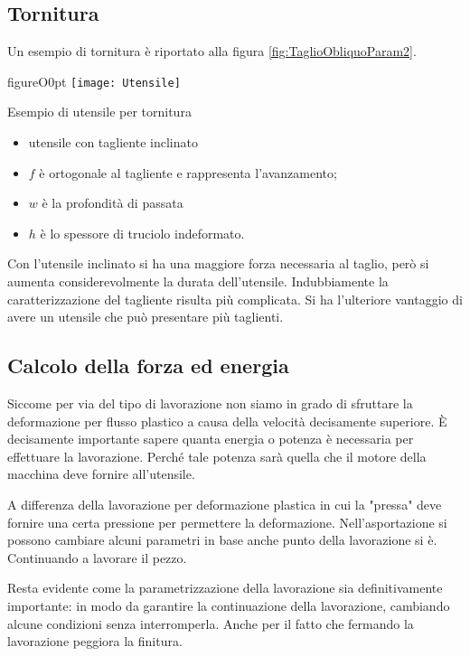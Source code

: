 \subsection{Tornitura}
Un esempio di tornitura è riportato alla figura \ref{fig:TaglioObliquoParam2}.
\begin{wrapfloat}{figure}{O}{0pt}
\texttt{[image: Utensile]}
\caption{Esempio di utensile per tornitura}
\label{fig:UtensileTornitua}
\end{wrapfloat}

\begin{itemize}
\item utensile con tagliente inclinato
\item $f$ è ortogonale al tagliente e rappresenta 
l'avanzamento;
\item $w$ è la profondità di passata
\item $h$ è lo spessore di truciolo indeformato.
\end{itemize}

Con l'utensile inclinato si ha una maggiore forza 
necessaria al taglio, però si aumenta 
considerevolmente la durata dell'utensile.
Indubbiamente la caratterizzazione del tagliente 
risulta più complicata. Si ha l'ulteriore vantaggio
di avere un utensile che può presentare più 
taglienti.

\subsection{Calcolo della forza ed energia}
Siccome per via del tipo di lavorazione non siamo in grado di sfruttare
la deformazione per flusso plastico a causa della velocità decisamente 
superiore.
È decisamente importante sapere quanta energia o potenza è necessaria 
per effettuare la lavorazione. Perché tale potenza sarà quella che il
motore della macchina deve fornire all'utensile.

A differenza della lavorazione per deformazione plastica in cui 
la "pressa" deve fornire una certa pressione per permettere la 
deformazione. Nell'asportazione si possono cambiare alcuni
parametri in base anche punto della lavorazione si è.
Continuando a lavorare il pezzo.

Resta evidente come la parametrizzazione della lavorazione sia
definitivamente importante: in modo da garantire la continuazione
della lavorazione, cambiando alcune condizioni senza interromperla.
Anche per il fatto che fermando la lavorazione peggiora la finitura.

